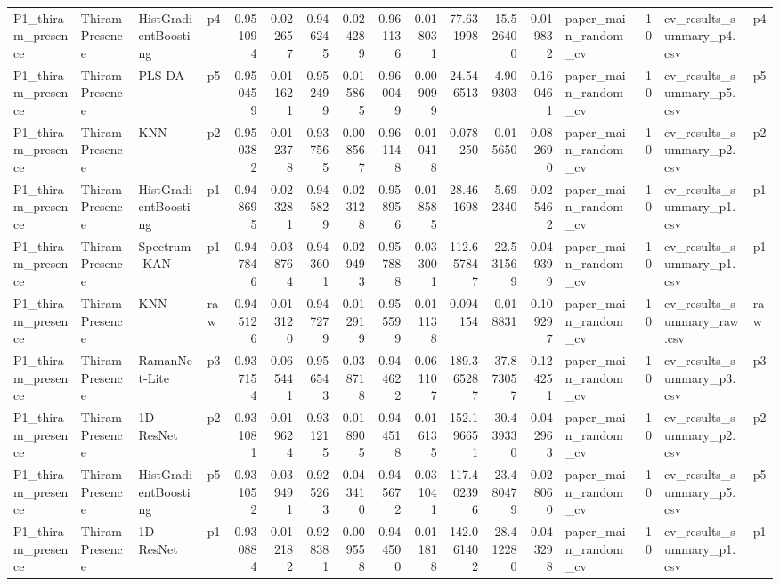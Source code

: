 \begin{tabular}{llllrrrrrrrrrlrll}
P1_thiram_presence & Thiram Presence & HistGradientBoosting & p4 & 0.951094 & 0.022657 & 0.946245 & 0.024289 & 0.961136 & 0.018031 & 77.631998 & 15.526400 & 0.019832 & paper_main_random_cv & 10 & cv_results_summary_p4.csv & p4 \\
P1_thiram_presence & Thiram Presence & PLS-DA & p5 & 0.950459 & 0.011621 & 0.952499 & 0.015865 & 0.960049 & 0.009099 & 24.546513 & 4.909303 & 0.160461 & paper_main_random_cv & 10 & cv_results_summary_p5.csv & p5 \\
P1_thiram_presence & Thiram Presence & KNN & p2 & 0.950382 & 0.012378 & 0.937565 & 0.008567 & 0.961148 & 0.010418 & 0.078250 & 0.015650 & 0.082690 & paper_main_random_cv & 10 & cv_results_summary_p2.csv & p2 \\
P1_thiram_presence & Thiram Presence & HistGradientBoosting & p1 & 0.948695 & 0.023281 & 0.945829 & 0.023128 & 0.958956 & 0.018585 & 28.461698 & 5.692340 & 0.025462 & paper_main_random_cv & 10 & cv_results_summary_p1.csv & p1 \\
P1_thiram_presence & Thiram Presence & Spectrum-KAN & p1 & 0.947846 & 0.038764 & 0.943601 & 0.029493 & 0.957888 & 0.033001 & 112.657847 & 22.531569 & 0.049399 & paper_main_random_cv & 10 & cv_results_summary_p1.csv & p1 \\
P1_thiram_presence & Thiram Presence & KNN & raw & 0.945126 & 0.013120 & 0.947279 & 0.012919 & 0.955599 & 0.011138 & 0.094154 & 0.018831 & 0.109297 & paper_main_random_cv & 10 & cv_results_summary_raw.csv & raw \\
P1_thiram_presence & Thiram Presence & RamanNet-Lite & p3 & 0.937154 & 0.065441 & 0.956543 & 0.038718 & 0.944622 & 0.061107 & 189.365287 & 37.873057 & 0.124251 & paper_main_random_cv & 10 & cv_results_summary_p3.csv & p3 \\
P1_thiram_presence & Thiram Presence & 1D-ResNet & p2 & 0.931081 & 0.019624 & 0.931215 & 0.018905 & 0.944518 & 0.016135 & 152.196651 & 30.439330 & 0.042963 & paper_main_random_cv & 10 & cv_results_summary_p2.csv & p2 \\
P1_thiram_presence & Thiram Presence & HistGradientBoosting & p5 & 0.931052 & 0.039491 & 0.925263 & 0.043410 & 0.945672 & 0.031041 & 117.402396 & 23.480479 & 0.028060 & paper_main_random_cv & 10 & cv_results_summary_p5.csv & p5 \\
P1_thiram_presence & Thiram Presence & 1D-ResNet & p1 & 0.930884 & 0.012182 & 0.928381 & 0.009558 & 0.944500 & 0.011818 & 142.061402 & 28.412280 & 0.043298 & paper_main_random_cv & 10 & cv_results_summary_p1.csv & p1 \\

\end{tabular}
